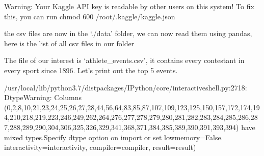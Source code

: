 \documentclass[letterpaper,10pt,english]{jupyterBook}
\begin{document}
\begin{sphinxVerbatim}[commandchars=\\\{\}]
Warning: Your Kaggle API key is readable by other users on this system! To fix this, you can run \PYGZsq{}chmod 600 /root/.kaggle/kaggle.json\PYGZsq{}
\end{sphinxVerbatim}

\sphinxAtStartPar
the csv files are now in the ‘./data’ folder, we can now read them using pandas, here is the list of all csv files in our folder

\begin{sphinxVerbatim}[commandchars=\\\{\}]
\end{sphinxVerbatim}

\begin{sphinxVerbatim}
\end{sphinxVerbatim}

\sphinxAtStartPar
The file of our interest is ‘athlete\_events.csv’, it contains every contestant in every sport since 1896. Let’s print out the top 5 events.

\begin{sphinxVerbatim}[commandchars=\\\{\}]
  
  
\end{sphinxVerbatim}

\begin{sphinxVerbatim}[commandchars=\\\{\}]
/usr/local/lib/python3.7/dist\PYGZhy{}packages/IPython/core/interactiveshell.py:2718: DtypeWarning: Columns (0,2,8,10,21,23,24,25,26,27,28,44,56,64,83,85,87,107,109,123,125,150,157,172,174,194,210,218,219,223,246,249,262,264,276,277,278,279,280,281,282,283,284,285,286,287,288,289,290,304,306,325,326,329,341,368,371,384,385,389,390,391,393,394) have mixed types.Specify dtype option on import or set low\PYGZus{}memory=False.
  interactivity=interactivity, compiler=compiler, result=result)
\end{sphinxVerbatim}
\end{document}
